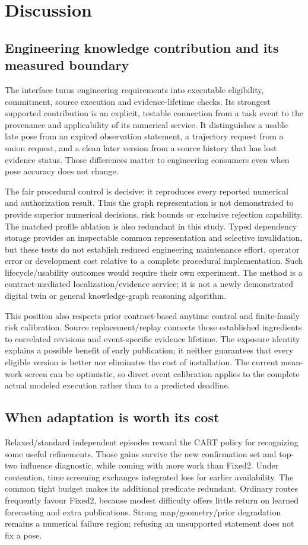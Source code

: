 \section{Discussion}\label{sec:discussion}
\subsection{Engineering knowledge contribution and its measured boundary}
The interface turns engineering requirements into executable eligibility, commitment, source execution and evidence-lifetime checks. Its strongest supported contribution is an explicit, testable connection from a task event to the provenance and applicability of its numerical service. It distinguishes a usable late pose from an expired observation statement, a trajectory request from a union request, and a clean later version from a source history that has lost evidence status. Those differences matter to engineering consumers even when pose accuracy does not change.

The fair procedural control is decisive: it reproduces every reported numerical and authorization result. Thus the graph representation is not demonstrated to provide superior numerical decisions, risk bounds or exclusive rejection capability. The matched profile ablation is also redundant in this study. Typed dependency storage provides an inspectable common representation and selective invalidation, but these tests do not establish reduced engineering maintenance effort, operator error or development cost relative to a complete procedural implementation. Such lifecycle/usability outcomes would require their own experiment. The method is a contract-mediated localization/evidence service; it is not a newly demonstrated digital twin or general knowledge-graph reasoning algorithm.

This position also respects prior contract-based anytime control and finite-family risk calibration. Source replacement/replay connects those established ingredients to correlated revisions and event-specific evidence lifetime. The exposure identity explains a possible benefit of early publication; it neither guarantees that every eligible version is better nor eliminates the cost of installation. The current mean-work screen can be optimistic, so direct event calibration applies to the complete actual modeled execution rather than to a predicted deadline.

\subsection{When adaptation is worth its cost}
Relaxed/standard independent episodes reward the CART policy for recognizing some useful refinements. Those gains survive the new confirmation set and top-two influence diagnostic, while coming with more work than Fixed2. Under contention, time screening exchanges integrated loss for earlier availability. The common tight budget makes its additional predicate redundant. Ordinary routes frequently favour Fixed2, because modest difficulty offers little return on learned forecasting and extra publications. Strong map/geometry/prior degradation remains a numerical failure region; refusing an unsupported statement does not fix a pose.

